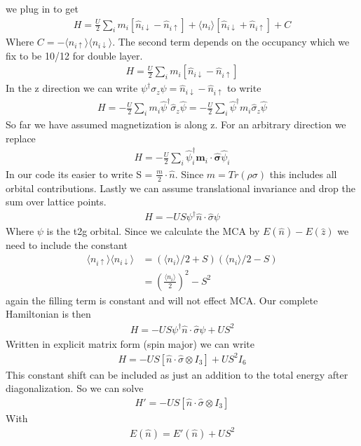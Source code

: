 \documentclass[11pt]{article}
\begin{document}
we plug in to get
\begin{align}
    H = \frac{U}{2}\sum_i m_i\left[\hat n_{i\downarrow} - \hat n_{i\uparrow}\right]  +\langle n_i\rangle \left[\hat n_{i\downarrow} + \hat n_{i\uparrow}\right] + C
\end{align}
Where $C = -\langle n_{i\uparrow}\rangle\langle n_{i\downarrow}\rangle$. The second term depends on the occupancy which we fix to be 10/12 for double layer.
\begin{gather}
    H=\frac{U}{2}\sum_i m_i\left[\hat n_{i\downarrow} - \hat n_{i\uparrow}\right]
\end{gather}
In the z direction we can write $\psi^\dagger \sigma_z\psi = \hat n_{i\downarrow} - \hat n_{i\uparrow}$ to write
\begin{gather}
    H=-\frac{U}{2}\sum_im_i\hat\psi^\dagger \hat\sigma_z \hat\psi = -\frac{U}{2}\sum_i\hat\psi^\dagger m_i\hat\sigma_z \hat\psi
\end{gather}
So far we have assumed magnetization is along z. For an arbitrary direction we replace
\begin{gather}
    H=-\frac{U}{2}\sum_i \hat \psi_i^\dagger \bm m_i\cdot \bm{\hat \sigma} \hat \psi_i 
\end{gather}
In our code its easier to write S = $\frac{m}{2} \cdot \hat n$. Since $m = Tr(\rho \sigma)$ this includes all orbital contributions.
Lastly we can assume translational invariance and drop the sum over lattice points.
\begin{gather}
    H = -US \psi^\dagger \hat n \cdot \hat \sigma \psi
\end{gather}
Where $\psi$ is the t2g orbital. Since we calculate the MCA by $E(\hat n) - E(\hat z)$ we need to include the constant
\begin{align}
    \langle n_{i\uparrow}\rangle\langle n_{i\downarrow}\rangle &= (\langle n_i\rangle/2 + S)(\langle n_i\rangle/2 - S) \\\nonumber
    &= \left(\frac{\langle n_i\rangle}{2}\right)^2 - S^2
\end{align}
again the filling term is constant and will not effect MCA. Our complete Hamiltonian is then
\begin{align}
    H = -US \psi^\dagger \hat n \cdot \hat \sigma \psi + US^2
\end{align}
Written in explicit matrix form (spin major) we can write
\begin{align}
    H = -US \left[\hat n \cdot \hat \sigma \otimes I_3\right] + US^2 I_6
\end{align}
This constant shift can be included as just an addition to the total energy after diagonalization.
So we can solve
\begin{align}
    H' = -US \left[\hat n \cdot \hat \sigma \otimes I_3\right]
\end{align}
With 
\begin{gather}
    E(\hat n) = E'(\hat n) + US^2
\end{gather}
\end{document}
